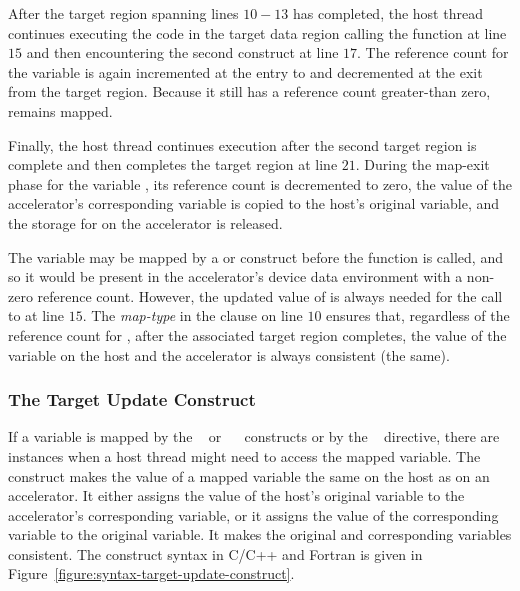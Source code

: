 After the target region spanning lines $10-13$ has completed, the host thread
continues executing the code in the target data region calling the function  at
line $15$ and then encountering the second  construct at line
$17$.  The reference count for the variable  is again incremented at the
entry to and decremented at the exit from the target region.  Because it still
has a reference count greater-than zero,  remains mapped.

Finally, the host thread continues execution after the second target region is
complete and then completes the target region at line $21$.  During the map-exit
phase for the variable , its reference count is decremented to zero, the
value of the accelerator's corresponding  variable is copied to the host's
original  variable, and the storage for  on the accelerator is released.

The variable  may be mapped by a  or  construct 
before the function  is called, and so it would be present in the accelerator's
device data environment with a non-zero reference count.
However, the updated value of  is always needed for the call to  at line $15$.
The  \emph{map-type} in the  clause on line $10$ ensures
that, regardless of the reference count for , after the associated target
region completes, the value of the variable  on the host and the accelerator
is always consistent (the same).  

\subsubsection{The Target Update Construct}
\label{ssec:06.target_update_construct}

If a variable is mapped by the ~ or
~~ constructs or by the
~ directive, there are instances when a host thread
might need to access the mapped variable.  The  construct
makes the value of a mapped variable the same on the host as on an
accelerator.  It either assigns the value of the host's original variable to
the accelerator's corresponding variable, or it assigns the
value of the corresponding variable to the original variable. It makes the
original and corresponding variables consistent.  The 
construct syntax in C/C++ and Fortran is given in
Figure~\ref{figure:syntax-target-update-construct}.

